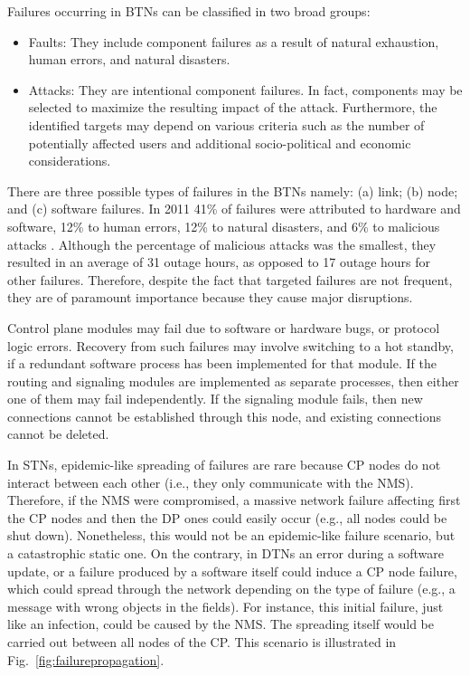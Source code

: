 \documentclass[10pt,draftclsnofoot,onecolumn,journal]{IEEEtran}
\begin{document}
Failures occurring in BTNs can be classified in two broad groups:
\begin{itemize}
	\item Faults: They include component failures as a result of natural exhaustion, human errors, and natural disasters.
	\item Attacks: They are intentional component failures. In fact, components may be selected to maximize the resulting impact of the attack. Furthermore, the identified targets may depend on various criteria such as the number of potentially affected users and additional socio-political and economic considerations.
\end{itemize}

There are three possible types of failures in the BTNs namely: (a) link; (b) node; and (c) software failures. In 2011 41\% of failures were attributed to hardware and software, 12\% to human errors, 12\% to natural disasters, and 6\% to malicious attacks \cite{CCC2011}. Although the percentage of malicious attacks was the smallest, they resulted in an average of 31 outage hours, as opposed to 17 outage hours for other failures. Therefore, despite the fact that targeted failures are not frequent, they are of paramount importance because they cause major disruptions. 

Control plane modules may fail due to software or hardware bugs, or protocol logic errors. Recovery from such failures may involve switching to a hot standby, if a redundant software process has been implemented for that module. If the routing and signaling modules are implemented as separate processes, then either one of them may fail independently. If the signaling module fails, then new connections cannot be established through this node, and existing connections cannot be deleted.

In STNs, epidemic-like spreading of failures are rare because CP nodes do not interact between each other (i.e., they only communicate with the NMS). Therefore, if the NMS were compromised, a massive network failure affecting first the CP nodes and then the DP ones could easily occur (e.g., all nodes could be shut down). Nonetheless, this would not be an epidemic-like failure scenario, but a catastrophic static one. On the contrary, in DTNs an error during a software update, or a failure produced by a software itself could induce a CP node failure, which could spread through the network depending on the type of failure (e.g., a message with wrong objects in the fields). For instance, this initial failure, just like an infection, could be caused by the NMS. The spreading itself would be carried out between all nodes of the CP. This scenario is illustrated in Fig.~\ref{fig:failurepropagation}.
\end{document}
